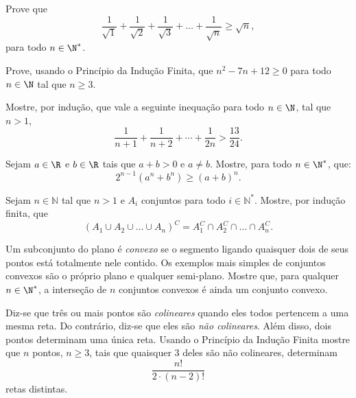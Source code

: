 \begin{exercise}
Prove que
$$\frac 1 {\sqrt 1} +\frac 1 {\sqrt 2} +\frac 1 {\sqrt 3} + \dots + \frac 1 {\sqrt n} \geq \sqrt n,$$
para todo $ n \in \N^*$.
\end{exercise}

\begin{exercise}\label{exercicio:polinomio}
	Prove, usando o Princípio da Indução Finita, que $n^2 - 7n +12 \geq 0$ para todo $n \in \N$ tal que $n \geq 3$.
\end{exercise}

\begin{exercise}
	Mostre, por indução, que vale a seguinte inequação para todo $n \in \N$, tal que $n > 1$,
	$$\dfrac 1 {n+1} + \dfrac 1 {n+2} + \cdots + \dfrac 1 {2n} > \dfrac {13}{24}.$$
\end{exercise}

\begin{exercise}
	Sejam $a \in \R$ e $b \in \R$ tais que $a+b>0$ e $a \neq b$. Mostre, para todo $n \in \N^\ast$, que:
            $$ 2^{n-1}(a^n + b^n) \geq (a+b)^n .$$
\end{exercise}

\begin{exercise}
	Sejam $n \in \mathbb{N}$ tal que $n >1$ e $A_i$ conjuntos para todo $i \in \mathbb{N}^\ast$. Mostre, por indução finita, que $$\left( A_1 \cup A_2 \cup \dots \cup A_n \right)^C = A_1^C \cap A_2 ^C \cap \dots \cap A_n^C.$$
\end{exercise}

\begin{exercise}
Um subconjunto do plano é \emph{convexo} se o segmento ligando quaisquer dois de seus pontos está totalmente nele contido.
Os exemplos mais simples de conjuntos convexos são o próprio plano e qualquer semi-plano.
Mostre que, para qualquer $n \in \N^*$, a interseção de $n$ conjuntos convexos é ainda um conjunto convexo.
\end{exercise}

\begin{exercise}
Diz-se que três ou mais pontos são \emph{colineares} quando eles todos pertencem a uma mesma reta.
Do contrário, diz-se que eles são \emph{não colineares}.
Além disso, dois pontos determinam uma única reta.
Usando o Princípio da Indução Finita mostre que $n$ pontos, $n\geq 3$, tais que quaisquer 3 deles são não colineares, determinam
$$\frac{n!}{2\cdot(n-2)!}$$
retas distintas.
\end{exercise}
